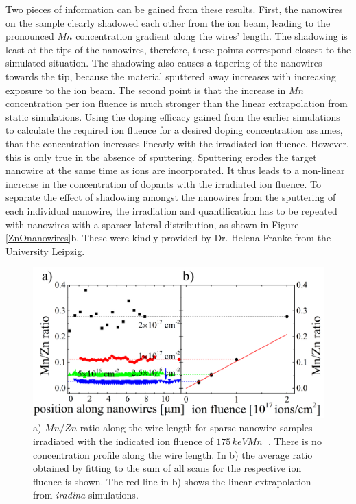 Two pieces of information can be gained from these results. First, the nanowires on the sample clearly shadowed each other from the ion beam, leading to the pronounced $Mn$ concentration gradient along the wires' length. The shadowing is least at the tips of the nanowires, therefore, these points correspond closest to the simulated situation. The shadowing also causes a tapering of the nanowires towards the tip, because the material sputtered away increases with increasing exposure to the ion beam. The second point is that the increase in $Mn$ concentration per ion fluence is much stronger than the linear extrapolation from static simulations. Using the doping efficacy gained from the earlier simulations to calculate the required ion fluence for a desired doping concentration assumes, that the concentration increases linearly with the irradiated ion fluence. However, this is only true in the absence of sputtering. Sputtering erodes the target nanowire at the same time as ions are incorporated. It thus leads to a non-linear increase in the concentration of dopants with the irradiated ion fluence. To separate the effect of shadowing amongst the nanowires from the sputtering of each individual nanowire, the irradiation and quantification has to be repeated with nanowires with a sparser lateral distribution, as shown in Figure \ref{ZnOnanowires}b. These were kindly provided by Dr. Helena Franke from the University Leipzig.


\begin{figure}[th]
	\centering
		\includegraphics[width=.85\textwidth]{images/MnZn2.png}
	\caption{a) $Mn/Zn$ ratio along the wire length for sparse nanowire samples irradiated with the indicated ion fluence of $175\,keV Mn^+$. There is no concentration profile along the wire length. In b) the average ratio obtained by fitting to the sum of all scans for the respective ion fluence is shown. The red line in b) shows the linear extrapolation from \emph{iradina} simulations.}
	\label{MnZn2}
\end{figure} 

